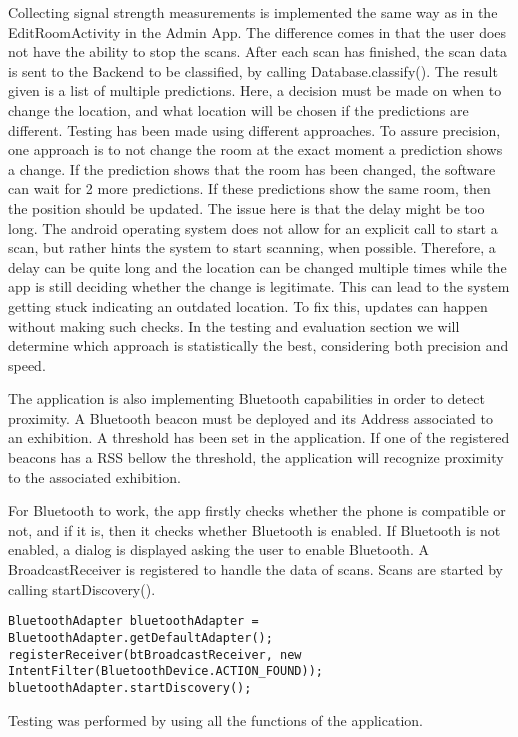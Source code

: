 Collecting signal strength measurements is implemented the same way as in the EditRoomActivity in the Admin App. The difference comes in that the user does not have the ability to stop the scans. After each scan has finished, the scan data is sent to the Backend to be classified, by calling Database.classify(). The result given is a list of multiple predictions. Here, a decision must be made on when to change the location, and what location will be chosen if the predictions are different. Testing has been made using different approaches. To assure precision, one approach is to not change the room at the exact moment a prediction shows a change. If the prediction shows that the room has been changed, the software can wait for 2 more predictions. If these predictions show the same room, then the position should be updated. The issue here is that the delay might be too long. The android operating system does not allow for an explicit call to start a scan, but rather hints the system to start scanning, when possible. Therefore, a delay can be quite long and the location can be changed multiple times while the app is still deciding whether the change is legitimate. This can lead to the system getting stuck indicating an outdated location. To fix this, updates can happen without making such checks. In the testing and evaluation section we will determine which approach is statistically the best, considering both precision and speed.

The application is also implementing Bluetooth capabilities in order to detect proximity. A Bluetooth beacon must be deployed and its Address associated to an exhibition. A threshold has been set in the application. If one of the registered beacons has a RSS bellow the threshold, the application will recognize proximity to the associated exhibition. 

For Bluetooth to work, the app firstly checks whether the phone is compatible or not, and if it is, then it checks whether Bluetooth is enabled. If Bluetooth is not enabled, a dialog is displayed asking the user to enable Bluetooth. A BroadcastReceiver is registered to handle the data of scans. Scans are started by calling startDiscovery().
\begin{lstlisting}
BluetoothAdapter bluetoothAdapter = BluetoothAdapter.getDefaultAdapter();
registerReceiver(btBroadcastReceiver, new IntentFilter(BluetoothDevice.ACTION_FOUND));
bluetoothAdapter.startDiscovery();
\end{lstlisting}

Testing was performed by using all the functions of the application.
